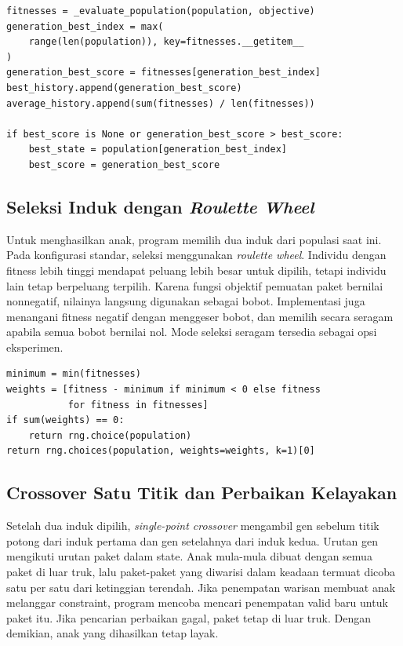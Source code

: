 \begin{lstlisting}[caption={Evaluasi populasi dan pembaruan solusi terbaik},label={lst:ga-evaluate}]
fitnesses = _evaluate_population(population, objective)
generation_best_index = max(
    range(len(population)), key=fitnesses.__getitem__
)
generation_best_score = fitnesses[generation_best_index]
best_history.append(generation_best_score)
average_history.append(sum(fitnesses) / len(fitnesses))

if best_score is None or generation_best_score > best_score:
    best_state = population[generation_best_index]
    best_score = generation_best_score
\end{lstlisting}

\subsection{Seleksi Induk dengan \textit{Roulette Wheel}}

Untuk menghasilkan anak, program memilih dua induk dari populasi saat ini. Pada konfigurasi standar, seleksi menggunakan \textit{roulette wheel}. Individu dengan fitness lebih tinggi mendapat peluang lebih besar untuk dipilih, tetapi individu lain tetap berpeluang terpilih. Karena fungsi objektif pemuatan paket bernilai nonnegatif, nilainya langsung digunakan sebagai bobot. Implementasi juga menangani fitness negatif dengan menggeser bobot, dan memilih secara seragam apabila semua bobot bernilai nol. Mode seleksi seragam tersedia sebagai opsi eksperimen.

\begin{lstlisting}[caption={Pemilihan induk secara roulette},label={lst:ga-selection}]
minimum = min(fitnesses)
weights = [fitness - minimum if minimum < 0 else fitness
           for fitness in fitnesses]
if sum(weights) == 0:
    return rng.choice(population)
return rng.choices(population, weights=weights, k=1)[0]
\end{lstlisting}

\subsection{Crossover Satu Titik dan Perbaikan Kelayakan}

Setelah dua induk dipilih, \textit{single-point crossover} mengambil gen sebelum titik potong dari induk pertama dan gen setelahnya dari induk kedua. Urutan gen mengikuti urutan paket dalam state. Anak mula-mula dibuat dengan semua paket di luar truk, lalu paket-paket yang diwarisi dalam keadaan termuat dicoba satu per satu dari ketinggian terendah. Jika penempatan warisan membuat anak melanggar constraint, program mencoba mencari penempatan valid baru untuk paket itu. Jika pencarian perbaikan gagal, paket tetap di luar truk. Dengan demikian, anak yang dihasilkan tetap layak.

